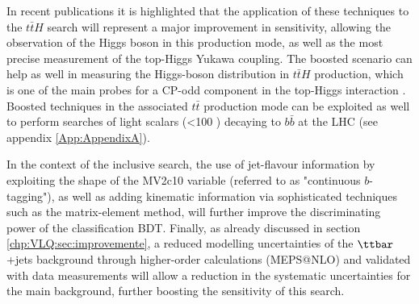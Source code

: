 In recent publications \cite{Moretti:2015vaa} it is highlighted that the application of these techniques to the $t\bar{t}H$ search will represent a major improvement in sensitivity, allowing the observation of the Higgs boson in this production mode, as well as the most precise measurement of the top-Higgs Yukawa coupling.
The boosted scenario can help as well in measuring the Higgs-boson \pt distribution in $t\bar{t}H$ production, which is one of the main probes for a CP-odd component in the top-Higgs interaction \cite{Degrande:2012gr}. Boosted techniques in the associated $t\bar{t}$ production mode can be exploited as well to perform searches of light scalars (<100 \gev) decaying to $b\bar{b}$ at the LHC (see appendix \ref{App:AppendixA}).\par
In the context of the inclusive search, the use of jet-flavour information by exploiting the shape of the MV2c10 variable (referred to as "continuous $b$-tagging"), as well as adding kinematic information via sophisticated techniques such as the matrix-element method, will further improve the discriminating power of the classification BDT.
Finally, as already discussed in section \ref{chp:VLQ:sec:improvemente}, a reduced modelling uncertainties of the $\ttbar$+jets background through higher-order calculations (MEPS@NLO) and validated with data measurements will allow a reduction in the systematic uncertainties for the main background, further boosting the sensitivity of this search.

